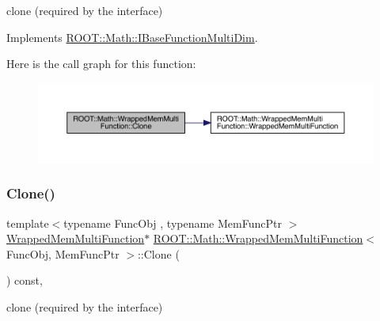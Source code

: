 clone (required by the interface) 



Implements \mbox{\hyperlink{classROOT_1_1Math_1_1IBaseFunctionMultiDim_a57939204b1f525b43835b42e0635dd3b}{R\+O\+O\+T\+::\+Math\+::\+I\+Base\+Function\+Multi\+Dim}}.

Here is the call graph for this function\+:
\nopagebreak
\begin{figure}[H]
\begin{center}
\leavevmode
\includegraphics[width=350pt]{d3/dd9/classROOT_1_1Math_1_1WrappedMemMultiFunction_ab9f49fc9a151e8d921dbe9cb148c1fc8_cgraph}
\end{center}
\end{figure}
\mbox{\label{classROOT_1_1Math_1_1WrappedMemMultiFunction_ab9f49fc9a151e8d921dbe9cb148c1fc8}} 
\subsubsection{\texorpdfstring{Clone()}{Clone()}\hspace{0.1cm}{\footnotesize\ttfamily [2/2]}}
{\footnotesize\ttfamily template$<$typename Func\+Obj , typename Mem\+Func\+Ptr $>$ \\
\mbox{\hyperlink{classROOT_1_1Math_1_1WrappedMemMultiFunction}{Wrapped\+Mem\+Multi\+Function}}$\ast$ \mbox{\hyperlink{classROOT_1_1Math_1_1WrappedMemMultiFunction}{R\+O\+O\+T\+::\+Math\+::\+Wrapped\+Mem\+Multi\+Function}}$<$ Func\+Obj, Mem\+Func\+Ptr $>$\+::Clone (\begin{DoxyParamCaption}{ }\end{DoxyParamCaption}) const\hspace{0.3cm}{\ttfamily [inline]}, {\ttfamily [virtual]}}



clone (required by the interface) 



